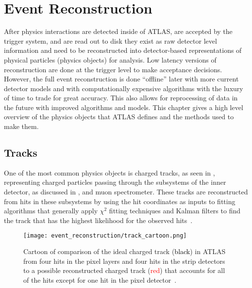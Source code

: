\chapter{Event Reconstruction}\label{chapter:event_reconstruction}

After physics interactions are detected inside of \gls{ATLAS}, are accepted by the trigger system, and are read out to disk they exist as raw detector level information and need to be reconstructed into detector-based representations of physical particles (physics objects) for analysis.
Low latency versions of reconstruction are done at the trigger level to make acceptance decisions.
However, the full event reconstruction is done ``offline'' later with more current detector models and with computationally expensive algorithms with the luxury of time to trade for great accuracy.
This also allows for reprocessing of data in the future with improved algorithms and models.
This chapter gives a high level overview of the physics objects that ATLAS defines and the methods used to make them.

\section{Tracks}\label{section:tracks}

One of the most common physics objects is charged tracks, as seen in , representing charged particles passing through the subsystems of the \gls{inner detector}, as discussed in , and \gls{muon spectrometer}.
These tracks are reconstructed from hits in these subsystems by using the hit coordinates as inputs to fitting algorithms that generally apply $\chi^{2}$ fitting techniques and Kalman filters to find the track that has the highest likelihood for the observed hits~\cite{Fruhwirth:1987fm,Fruhwirth:2003702,Strandlie:1999,Bugge:1981,Salzburger:2008cea}.

\begin{figure}[htbp]
 \centering
 \texttt{[image: event\_reconstruction/track\_cartoon.png]}
 \caption[Cartoon of comparison of the ideal charged track to a possible reconstructed charged track.]{%
  Cartoon of comparison of the ideal charged track (\textcolor{black}{black}) in ATLAS from four hits in the pixel layers and four hits in the strip detectors to a possible reconstructed charged track (\textcolor{red}{red}) that accounts for all of the hits except for one hit in the pixel detector~\cite{Salzburger:HammersAndNails}.}
 \label{fig:track_cartoon}
\end{figure}

